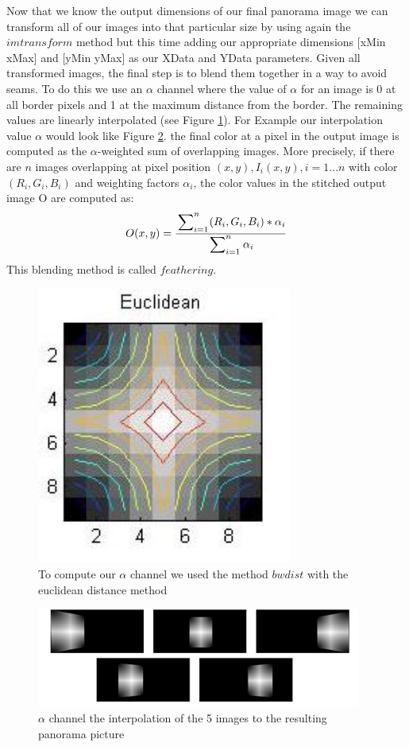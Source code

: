 \documentclass[subfigure,epsfig,fleqn,float,numbers=noenddot]{scrartcl}
\begin{document}
Now that we know the output dimensions of our final panorama image we can transform all of our images into that particular size by using again the $imtransform$ method but this time adding our appropriate dimensions [xMin xMax] and [yMin yMax] as our XData and YData parameters. Given all transformed images, the final step is to blend them together in a way to avoid seams. To do this we use an $\alpha$ channel where the value of $\alpha$ for an image is 0 at all border pixels and 1 at the maximum distance from the border. The remaining values are linearly interpolated (see Figure \ref{img:bwdist}). For Example our interpolation value $\alpha$ would look like Figure \ref{img:interpolation}. the final color at a pixel in the output image is computed as the $\alpha$-weighted sum of overlapping images. More precisely, if there are $n$ images overlapping at pixel position $(x,y), I_i(x,y), i = 1...n$ with color $(R_i,G_i,B_i)$ and weighting factors $\alpha_i$, the color values in the stitched output image O are computed as:
\begin{equation*}
	O(x,y) = \frac{\sideset{}{_{i=1}^n}\sum_{} (R_i,G_i,B_i) * \alpha_i} {\sideset{}{_{i=1}^n}\sum_{} \alpha_i}
\end{equation*}
This blending method is called $feathering$.
	\begin{figure}[H]
		\centering
		\includegraphics[width=0.75\textwidth]{./img/bwdist.jpg}
		\caption{To compute our $\alpha$ channel we used the method $bwdist$ with the euclidean distance method}
		\label{img:bwdist}
	\end{figure}
	\begin{figure}[H]
		\centering
		\includegraphics[width=0.95\textwidth]{./img/interpolationImg.png}
		\caption{$\alpha$ channel the interpolation of the 5 images to the resulting panorama picture}
		\label{img:interpolation}
	\end{figure}
	
\end{document}
